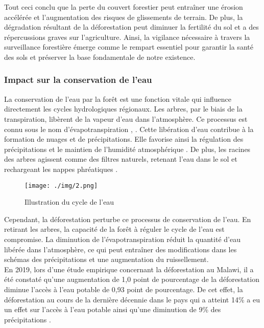 Tout ceci conclu que la perte du couvert forestier peut entraîner une érosion accélérée et l'augmentation des risques de glissements de terrain.  De plus, la dégradation résultant de la déforestation peut diminuer la fertilité du sol et a des répercussions graves sur l'agriculture. Ainsi, la vigilance nécessaire à travers la surveillance forestière émerge comme le rempart essentiel pour garantir la santé des sols et préserver la base fondamentale de notre existence.
\\

\subsubsection{Impact sur la conservation de l’eau}
La conservation de l'eau par la forêt est une fonction vitale qui influence directement les cycles hydrologiques régionaux. Les arbres, par le biais de la transpiration, libèrent de la vapeur d'eau dans l'atmosphère. Ce processus est connu sous le nom d’évapotranspiration \cite{13} , \cite{14}
. Cette libération d'eau contribue à la formation de nuages et de précipitations. Elle favorise ainsi la régulation des précipitations et le maintien de l'humidité atmosphérique \cite{15}. De plus, les racines des arbres agissent comme des filtres naturels, retenant l'eau dans le sol et rechargeant les nappes phréatiques \cite{16}.
\\


\begin{figure}[H]
	\centering
	\texttt{[image: ./img/2.png]}
	\caption{Illustration du cycle de l'eau
	}
\end{figure}

Cependant, la déforestation perturbe ce processus de conservation de l'eau. En retirant les arbres, la capacité de la forêt à réguler le cycle de l'eau est compromise. La diminution de l'évapotranspiration réduit la quantité d'eau libérée dans l'atmosphère, ce qui peut entraîner des modifications dans les schémas des précipitations et une augmentation du ruissellement. 
\\

En 2019, lors d’une étude empirique concernant la déforestation au Malawi, il a été constaté qu’une augmentation de 1,0 point de pourcentage de la déforestation diminue l’accès à l’eau potable de 0,93 point de pourcentage. De cet effet, la déforestation au cours de la dernière décennie dans le pays qui a atteint 14\% a eu un effet sur l’accès à l’eau potable ainsi qu’une diminution de 9\% des précipitations \cite{17}.
\\

